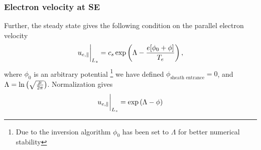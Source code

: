 \subsubsection{Electron velocity at SE}
%
Further, the steady state gives the following condition on the parallel electron velocity
%
\begin{align*}
    u_{e,\|} \bigg|_{L_z} = c_s \exp\left(\Lambda - \frac{e[\phi_0 + \phi]}{T_e}\right),
\end{align*}
%
where $\phi_0$ is an arbitrary potential%
%
\footnote{Due to the inversion algorithm $\phi_0$ has been set to $\Lambda$ for better numerical stability}%
%
we have defined $\phi_{\text{sheath entrance}} = 0$, and $\Lambda=\ln\left(\sqrt{\frac{\mu}{2\pi}}\right)$. Normalization gives
%
\begin{align*}
    u_{e,\|} \bigg|_{L_z} = \exp\left(\Lambda - \phi\right)
\end{align*}
%

